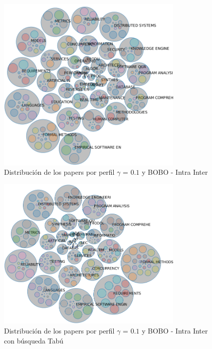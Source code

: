 \begin{figure}[H]
  \centering
    \includegraphics[width=0.8\textwidth]{resultados/papers/BOBO/INTRA_INTER/bubbles-gamma-01.png}
  \caption{Distribución de los papers por perfil $\gamma$ = $0.1$ y BOBO - Intra Inter}
  \label{res:img-papers-bubbles-gamma01-bobo-intra-inter}
\end{figure}

\begin{figure}[H]
  \centering
    \includegraphics[width=0.8\textwidth]{resultados/papers/BOBO/INTRA_INTER/bubbles-gamma-with-local-01.png}
  \caption{Distribución de los papers por perfil $\gamma$ = $0.1$ y BOBO - Intra Inter con búsqueda Tabú}
  \label{res:img-papers-bubbles-gamma01-hac-intra-inter-bobo}
\end{figure}

